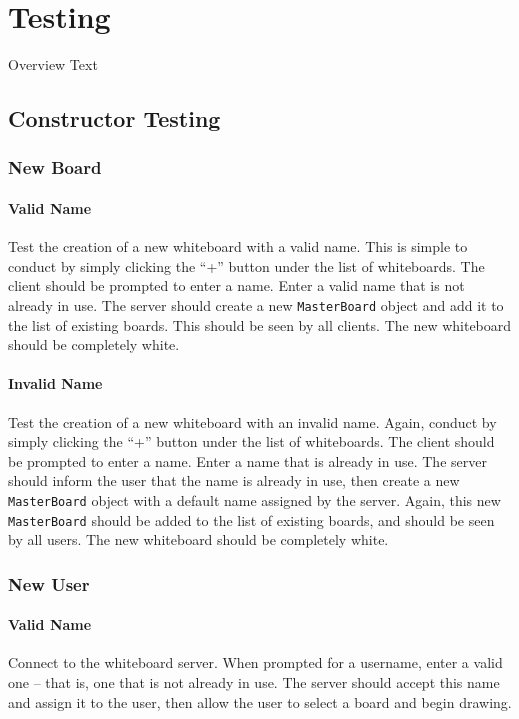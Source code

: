 \section{Testing}
Overview Text

\subsection{Constructor Testing}

\subsubsection{New Board} 

\paragraph{Valid Name}
Test the creation of a new whiteboard with a valid name. This is simple to conduct by simply clicking the “+” button under the list of whiteboards. The client should be prompted to enter a name. Enter a valid name that is not already in use. The server should create a new \texttt{MasterBoard} object and add it to the list of existing boards.  This should be seen by all clients. The new whiteboard should be completely white.

\paragraph{Invalid Name}
Test the creation of a new whiteboard with an invalid name. Again, conduct by simply clicking the “+” button under the list of whiteboards. The client should be prompted to enter a name. Enter a name that is already in use. The server should inform the user that the name is already in use, then create a new \texttt{MasterBoard} object with a default name assigned by the server. Again, this new \texttt{MasterBoard} should be added to the list of existing boards, and should be seen by all users. The new whiteboard should be completely white.

\subsubsection{New User}

\paragraph{Valid Name}
Connect to the whiteboard server.  When prompted for a username, enter a valid one – that is, one that is not already in use.  The server should accept this name and assign it to the user, then allow the user to select a board and begin drawing.

